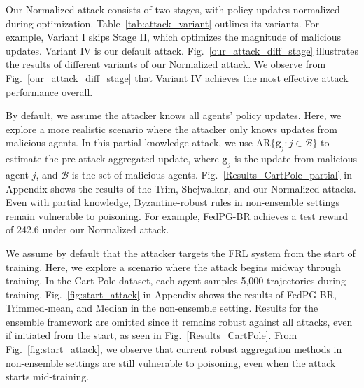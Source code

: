 %
%
Our Normalized attack consists of two stages, with policy updates normalized during optimization. Table~\ref{tab:attack_variant} outlines its variants. For example, Variant I skips Stage II, which optimizes the magnitude of malicious updates. Variant IV is our default attack. 
%
Fig.~\ref{our_attack_diff_stage} illustrates the results of different variants of our Normalized attack.
We observe from Fig.~\ref{our_attack_diff_stage} that Variant IV achieves the most effective attack performance overall.





%
%
%
By default, we assume the attacker knows all agents' policy updates. Here, we explore a more realistic scenario where the attacker only knows updates from malicious agents. In this partial knowledge attack, we use \(\text{AR} \{\bm{g}_j: j \in \mathcal{B}\}\) to estimate the pre-attack aggregated update, where \(\bm{g}_j\) is the update from malicious agent \(j\), and \(\mathcal{B}\) is the set of malicious agents. 
%
Fig.~\ref{Results_CartPole_partial} in Appendix shows the results of the Trim, Shejwalkar, and our Normalized attacks. Even with partial knowledge, Byzantine-robust rules in non-ensemble settings remain vulnerable to poisoning. For example, FedPG-BR achieves a test reward of 242.6 under our Normalized attack.






%
%
%
We assume by default that the attacker targets the FRL system from the start of training. Here, we explore a scenario where the attack begins midway through training. In the Cart Pole dataset, each agent samples 5,000 trajectories during training. 
%
Fig.~\ref{fig:start_attack} in Appendix shows the results of FedPG-BR, Trimmed-mean, and Median in the non-ensemble setting. Results for the ensemble framework are omitted since it remains robust against all attacks, even if initiated from the start, as seen in Fig.~\ref{Results_CartPole}. 
%
From Fig.~\ref{fig:start_attack}, we observe that current robust aggregation methods in non-ensemble settings are still vulnerable to poisoning, even when the attack starts mid-training.






